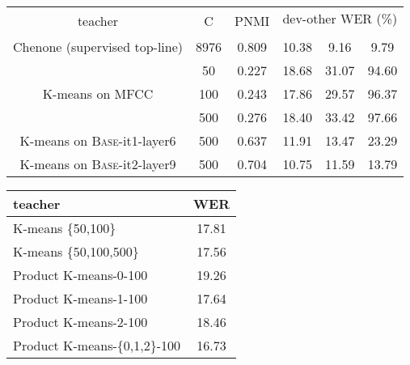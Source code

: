 \begin{table*}[t]
    \begin{minipage}[c]{0.68\textwidth}
        \centering
        \begin{tabular}{cc|c|ccc}
    \toprule
    \multirow{2}{*}{teacher} & \multirow{2}{*}{C} & 
    \multirow{2}{*}{PNMI} &
    \multicolumn{3}{c}{dev-other WER (\%)} \\
    & & &  &  &  \\
    \midrule\midrule
    Chenone (supervised top-line)  & 8976 & 0.809 & 10.38 & 9.16 & 9.79 \\
    \midrule
    \multirow{3}{*}{K-means on MFCC} 
    & 50  & 0.227 & 18.68 & 31.07 & 94.60 \\
    & 100 & 0.243 & 17.86 & 29.57 & 96.37 \\
    & 500 & 0.276 & 18.40 & 33.42 & 97.66 \\
    \midrule
    K-means on \textsc{Base}-it1-layer6 & 500 & 0.637 & 11.91 & 13.47 & 23.29 \\
    K-means on \textsc{Base}-it2-layer9 & 500 & 0.704 & 10.75 & 11.59 & 13.79 \\
    \bottomrule
\end{tabular}         \caption{The effect of the training objective and clustering quality on performance.  refers to the number of units, and  is the weight for masked frames.}
        \label{tab:loss}
    \end{minipage}
    \hspace{.5cm}
    \begin{minipage}[c]{0.28\textwidth}
        \centering
        \begin{tabular}{lc}
    \toprule
    teacher & WER \\
    \midrule\midrule
    K-means \{50,100\}       & 17.81 \\
    K-means \{50,100,500\}   & 17.56 \\
    \midrule
    Product K-means-0-100 & 19.26 \\
    Product K-means-1-100 & 17.64 \\
    Product K-means-2-100 & 18.46 \\
    Product K-means-\{0,1,2\}-100 & 16.73 \\
    \bottomrule
\end{tabular}%
         \caption{Cluster ensembles with k-means and product k-means.}
        \label{tab:ens}
    \end{minipage}
\end{table*}

